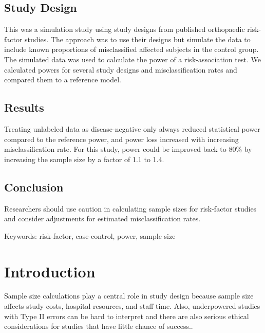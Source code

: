 \documentclass[
]{article}
\begin{document}
\hypertarget{study-design}{%
\subsection{Study Design}\label{study-design}}

This was a simulation study using study designs from published
orthopaedic risk-factor studies. The approach was to use their designs
but simulate the data to include known proportions of misclassified
affected subjects in the control group. The simulated data was used to
calculate the power of a risk-association test. We calculated powers for
several study designs and misclassification rates and compared them to a
reference model.

\hypertarget{results}{%
\subsection{Results}\label{results}}

Treating unlabeled data as disease-negative only always reduced
statistical power compared to the reference power, and power loss
increased with increasing misclassification rate. For this study, power
could be improved back to 80\% by increasing the sample size by a factor
of 1.1 to 1.4.

\hypertarget{conclusion}{%
\subsection{Conclusion}\label{conclusion}}

Researchers should use caution in calculating sample sizes for
risk-factor studies and consider adjustments for estimated
misclassification rates.

Keywords: risk-factor, case-control, power, sample size

\newpage

\hypertarget{introduction}{%
\section{Introduction}\label{introduction}}

Sample size calculations play a central role in study design because
sample size affects study costs, hospital resources, and staff time.
Also, underpowered studies with Type II errors can be hard to interpret
and there are also serious ethical considerations for studies that have
little chance of
success.\cite{ halpern2002continuing, hofmeister2007sample}.
\end{document}
